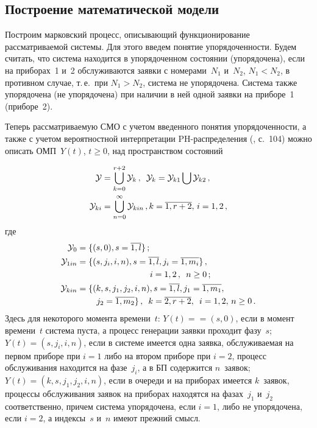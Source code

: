 \begin{multicols}{2}
\section{Построение математической модели}

Построим марковский процесс, описывающий функционирование рассматриваемой системы. 
Для этого введем понятие упорядоченности.  Будем считать, что система находится в 
упорядоченном состоянии (упорядочена), если на приборах~1 и~2 обслуживаются заявки с номерами~$N_1$ 
и~$N_2$, $N_1 < N_2$, в противном случае, т.\,е.\ при $N_1>N_2$, система не упорядочена. 
Система также упорядочена (не упорядочена) при наличии в ней одной заявки на приборе~1 (приборе~2).

Теперь рассматриваемую СМО  с учетом введенного понятия упорядоченности, а также 
с учетом вероятностной интерпретации PH-распределения (\cite{1mat}, с.~104) можно описать ОМП~$Y(t)$, 
$t\geq 0$, над пространством состояний

\noindent
\begin{align*}
\mathcal{Y}&=\bigcup\limits_{k=0}^{r+2}\mathcal{Y}_k\,,\enskip
\mathcal{Y}_k=\mathcal{Y}_{k1}\bigcup\mathcal{Y}_{k2}\,,\\
\mathcal{Y}_{ki}&=\bigcup_{n=0}^{\infty}\mathcal{Y}_{kin}\,,
k=\overline{1,r+2},\, i=1,2\,,
\end{align*}
где
\begin{align*}
\mathcal{Y}_0&=\{(s,0), s=\overline{1,l}\}\,;\\
\mathcal{Y}_{1in}&=\{(s,j_i,i,n), s=\overline{1,l}, j_i=\overline{1,m_i} \}\,, \\
&\hspace*{30mm}i=1,2\,, \enskip n\geq 0\,;\\
\mathcal{Y}_{kin}&=\{(k,s,j_1,j_2,i,n), s=\overline{1,l}, j_1=\overline{1,m_1},\\
&\hspace*{8mm} j_2=\overline{1,m_2}\}\,,\enskip
 k=\overline{2,r+2},\enskip i=1,2,\, n\geq 0\,.
\end{align*}
Здесь для некоторого момента времени~$t$: $Y(t)=$\linebreak $=(s,0)$, если в момент времени~$t$ система пус\-та, 
а процесс генерации заявки проходит фазу~$s$;  $Y(t)=(s,j_i,i,n)$, если в системе имеется одна 
заявка, обслуживаемая на первом приборе при $i=1$ либо на втором приборе при $i=2$, процесс 
обслуживания находится на фазе~$j_i$, а в БП содержится $n$~заявок; $Y(t)=(k,s,j_1,j_2,i,n)$, 
если в очереди и на приборах имеется $k$~заявок, процессы обслуживания заявок на приборах находятся 
на фазах~$j_1$ и~$j_2$ соответственно, причем система упорядочена, если $i=1$, либо не упорядочена, 
если $i=2$, а индексы~$s$ и~$n$ имеют прежний смысл.


\end{multicols}
